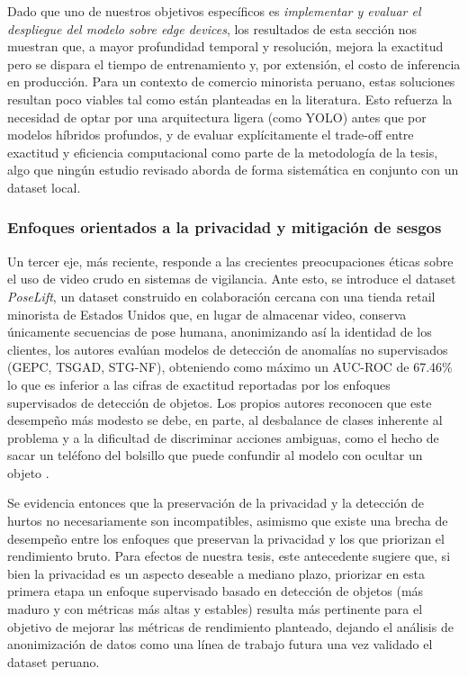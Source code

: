     Dado que uno de nuestros objetivos específicos es \textit{implementar y evaluar el despliegue del modelo sobre edge devices}, los resultados de esta sección nos muestran que, a mayor profundidad temporal y resolución, mejora la
    exactitud pero se dispara el tiempo de entrenamiento y, por extensión, el costo de inferencia en producción. Para un contexto de comercio
    minorista peruano, estas soluciones resultan poco viables tal como están planteadas en la literatura. Esto refuerza la necesidad de optar
    por una arquitectura ligera (como YOLO) antes que por modelos híbridos profundos, y de evaluar explícitamente el trade-off entre exactitud
    y eficiencia computacional como parte de la metodología de la tesis, algo que ningún estudio revisado aborda de forma sistemática en conjunto
    con un dataset local.
    
  \subsubsection{Enfoques orientados a la privacidad y mitigación de sesgos}
    Un tercer eje, más reciente, responde a las crecientes preocupaciones éticas sobre el uso de video crudo en sistemas de vigilancia.   
    Ante esto, se introduce el dataset \textit{PoseLift}, un dataset construido en colaboración cercana con una tienda retail minorista de Estados     Unidos que, en lugar de     almacenar video, conserva únicamente secuencias de pose humana, anonimizando así la identidad de los clientes, 
    los autores evalúan modelos de detección de anomalías no supervisados (GEPC, TSGAD, STG-NF), obteniendo como máximo un AUC-ROC de 67.46\% lo que es
    inferior a las cifras de exactitud reportadas por los enfoques supervisados de detección de objetos. Los propios autores reconocen que este desempeño
    más modesto se debe, en parte, al desbalance de clases inherente al problema y a la dificultad de discriminar acciones ambiguas, como el hecho de sacar
    un teléfono del bolsillo que puede confundir al modelo con ocultar un objeto \cite{rashvand_exploring_2025}.
    
    Se evidencia entonces que la preservación de la privacidad y la detección de hurtos no
    necesariamente son incompatibles, asimismo que existe una brecha de desempeño entre los enfoques que preservan la privacidad y los que priorizan
    el rendimiento bruto. Para efectos de nuestra tesis, este antecedente sugiere que, si bien la privacidad es un aspecto deseable a mediano plazo,
    priorizar en esta primera etapa un enfoque supervisado basado en detección de objetos (más maduro y con métricas más altas y estables) resulta más
    pertinente para el objetivo de mejorar las métricas de rendimiento planteado, dejando el análisis de anonimización de datos como una línea de trabajo
    futura una vez validado el dataset peruano.
  
